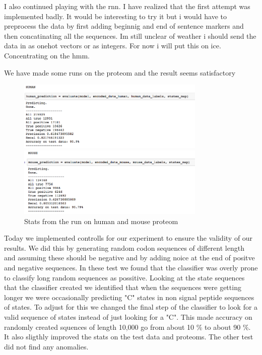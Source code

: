 \documentclass[a4paper]{tufte-handout}
\begin{document}
I also continued playing with the rnn. I have realized that the first attempt was implemented badly.
It would be interesting to try it but i would have to preprocess the data by first adding beginnig and end of sentence markers and then concatinating all the sequences. Im still unclear of weather i should send the data in as onehot vectors or as integers. For now i will put this on ice. Concentrating on the hmm.

We have made some runs on the proteom and the result seems satisfactory

\begin{figure}
    \begin{center}
      \includegraphics[width=0.8\textwidth]{pics/human_hmm_run.png}
    \end{center}
    \caption{Stats from the run on human and mouse proteom}

    \begin{center}
      \includegraphics[width=0.8\textwidth]{pics/mouse_hmm_run.png}
    \end{center}
\end{figure}
Today we implemented controlls for our experiment to ensure the validity of our results. We did this by generating random codon sequences of different length and assuming these should be negative and by adding noice at the end of positve and negative sequences. In these test we found that the classifier was overly prone to classify long random sequences as possitive. Looking at the state sequences that the classifier created we identified that when the sequences were getting longer we were occasionally predicting "C" states in non signal peptide sequences of states. To adjust for this we changed the final step of the classifier to look for a valid sequence of states instead of just looking for a "C". This made accuracy on randomly created squences of length 10,000 go from about 10 \% to about 90 \%. It also sligthly improved the stats on the test data and proteoms. The other test did not find any anomalies.

\hrulefill



\end{document}
